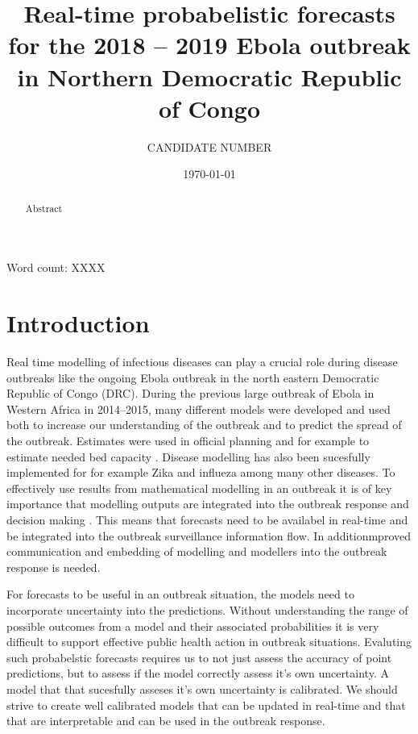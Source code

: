 \documentclass[12pt]{article}
\title{Real-time probabelistic forecasts for the 2018 -- 2019 Ebola outbreak in Northern Democratic Republic of Congo}
\author{
  CANDIDATE NUMBER
}
\date{\today}
\begin{document}
\maketitle


Word count: XXXX

\begin{abstract}
  Abstract

\end{abstract}

\newpage

\tableofcontents

\newpage

\section{Introduction}


Real time modelling of infectious diseases can play a crucial role during disease outbreaks like the ongoing Ebola outbreak in the north eastern Democratic Republic of Congo (DRC). During the previous large outbreak of Ebola in Western Africa in 2014--2015, many different models were developed\cite{chretienMathematicalModelingWest} and used both to increase our understanding of the outbreak and to predict the spread of the outbreak. Estimates were used in official planning\cite{EbolaVirusDisease2014}  and for example to estimate needed bed capacity \cite{camachoTemporalChangesEbola2015}. Disease modelling has also been sucesfully implemented for for example Zika \cite{kobresSystematicReviewEvaluation2019} and influeza \cite{chretienInfluenzaForecastingHuman2014} among many other diseases. To effectively use results from mathematical modelling in an outbreak it is of key importance that modelling outputs are integrated into the outbreak response and decision making \cite{riversUsingOutbreakScience2019a}. This means that forecasts need to be availabel in real-time and be integrated into the outbreak surveillance information flow. In additionmproved communication and embedding of modelling and modellers into the outbreak response is needed. 

For forecasts to be useful in an outbreak situation, the models need to incorporate uncertainty into the predictions\cite{funkAssessingPerformanceRealtime2019, weiCalibrationTestsCount2014,gneitingEditorialProbabilisticForecasting2008}. Without understanding the range of possible outcomes from a model and their associated probabilities it is very difficult to support effective public health action in outbreak situations. Evaluting such probabelstic forecasts requires us to not just assess the accuracy of point predictions, but to assess if the model correctly assess it's own uncertainty. A model that that sucesfully asseses it's own uncertainty is calibrated. We should strive to create well calibrated models that can be updated in real-time and that that are interpretable and can be used in the outbreak response. 
\end{document}
